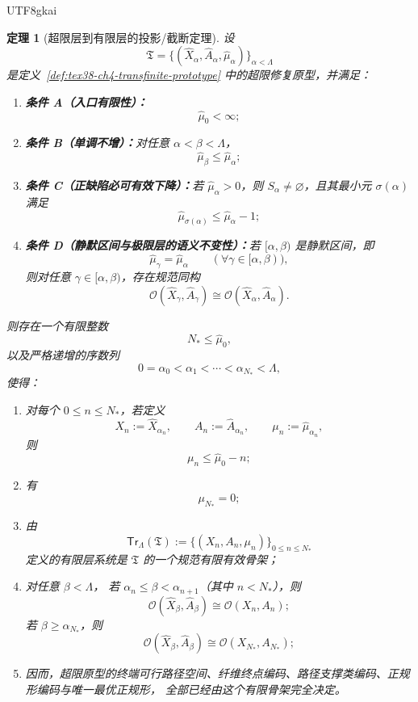 \documentclass[12pt]{article}
\newtheorem{theorem}{定理}[section]
\begin{document}
\begin{CJK*}{UTF8}{gkai}
\begin{theorem}[超限层到有限层的投影/截断定理]
\label{thm:tex38-ch4-projection}
设
\[
  \mathfrak T
  =
  \bigl\{
    (\widehat X_\alpha,\widehat A_\alpha,\widehat\mu_\alpha)
  \bigr\}_{\alpha<\Lambda}
\]
是定义~\ref{def:tex38-ch4-transfinite-prototype} 中的超限修复原型，并满足：
\begin{enumerate}
  \item \textbf{条件 A（入口有限性）：}
  \[
    \widehat\mu_0<\infty;
  \]
  \item \textbf{条件 B（单调不增）：}对任意 $\alpha<\beta<\Lambda$，
  \[
    \widehat\mu_\beta\le \widehat\mu_\alpha;
  \]
  \item \textbf{条件 C（正缺陷必可有效下降）：}若 $\widehat\mu_\alpha>0$，则 $S_\alpha\neq\varnothing$，且其最小元 $\sigma(\alpha)$ 满足
  \[
    \widehat\mu_{\sigma(\alpha)}
    \le
    \widehat\mu_\alpha-1;
  \]
  \item \textbf{条件 D（静默区间与极限层的语义不变性）：}若 $[\alpha,\beta)$ 是静默区间，即
  \[
    \widehat\mu_\gamma=\widehat\mu_\alpha
    \qquad
    (\forall \gamma\in[\alpha,\beta)),
  \]
  则对任意 $\gamma\in[\alpha,\beta)$，存在规范同构
  \[
    \mathcal O(\widehat X_\gamma,\widehat A_\gamma)
    \cong
    \mathcal O(\widehat X_\alpha,\widehat A_\alpha).
  \]
\end{enumerate}
则存在一个有限整数
\[
  N_\ast\le \widehat\mu_0,
\]
以及严格递增的序数列
\[
  0=\alpha_0<\alpha_1<\cdots<\alpha_{N_\ast}<\Lambda,
\]
使得：
\begin{enumerate}
  \item 对每个 $0\le n\le N_\ast$，若定义
  \[
    X_n:=\widehat X_{\alpha_n},
    \qquad
    A_n:=\widehat A_{\alpha_n},
    \qquad
    \mu_n:=\widehat\mu_{\alpha_n},
  \]
  则
  \[
    \mu_n\le \widehat\mu_0-n;
  \]
  \item 有
  \[
    \mu_{N_\ast}=0;
  \]
  \item 由
  \[
    \mathsf{Tr}_\Lambda(\mathfrak T)
    :=
    \bigl\{
      (X_n,A_n,\mu_n)
    \bigr\}_{0\le n\le N_\ast}
  \]
  定义的有限层系统是 $\mathfrak T$ 的一个\emph{规范有限有效骨架}；
  \item 对任意 $\beta<\Lambda$，
  若 $\alpha_n\le \beta<\alpha_{n+1}$（其中 $n<N_\ast$），则
  \[
    \mathcal O(\widehat X_\beta,\widehat A_\beta)
    \cong
    \mathcal O(X_n,A_n);
  \]
  若 $\beta\ge \alpha_{N_\ast}$，则
  \[
    \mathcal O(\widehat X_\beta,\widehat A_\beta)
    \cong
    \mathcal O(X_{N_\ast},A_{N_\ast});
  \]
  \item 因而，超限原型的终端可行路径空间、纤维终点编码、路径支撑类编码、正规形编码与唯一最优正规形，
  全部已经由这个有限骨架完全决定。
\end{enumerate}
\end{theorem}


\end{CJK*}
\end{document}
